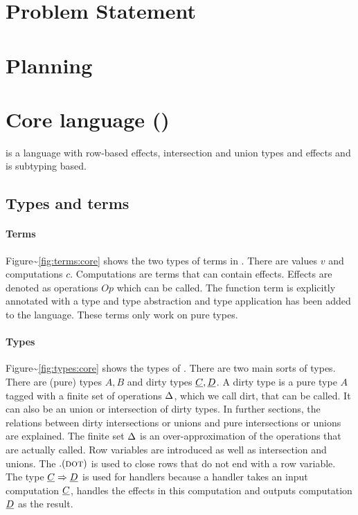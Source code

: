 \documentclass[sigplan,10pt]{acmart}\settopmatter{printfolios=true}
\begin{document}
\section{Problem Statement}\label{problem-statement}

\section{Planning}\label{planning}

\section{\texorpdfstring{Core language
(\core)}{Core language ()}}\label{core-language}

\core is a language with row-based effects, intersection and union types
and effects and is subtyping based.

\subsection{Types and terms}\label{types-and-terms-1}

\paragraph{Terms}

Figure\textasciitilde{}\ref{fig:terms:core} shows the two types of terms
in \core. There are values \(v\) and computations \(c\). Computations
are terms that can contain effects. Effects are denoted as operations
\(Op\) which can be called. The function term is explicitly annotated
with a type and type abstraction and type application has been added to
the language. These terms only work on pure types.

\paragraph{Types}

Figure\textasciitilde{}\ref{fig:types:core} shows the types of \core.
There are two main sorts of types. There are (pure) types \(A, B\) and
dirty types \(\underline{C}, \underline{D}\). A dirty type is a pure type \(A\) tagged with a
finite set of operations \(\Delta\), which we call dirt, that can be
called. It can also be an union or intersection of dirty types. In
further sections, the relations between dirty intersections or unions
and pure intersections or unions are explained. The finite set \(\Delta\)
is an over-approximation of the operations that are actually called. Row
variables are introduced as well as intersection and unions. The
\(. (\textsc{dot})\) is used to close rows that do not end with a row variable.
The type \(\underline{C} \Rightarrow \underline{D}\) is used for handlers because a handler takes an
input computation \(\underline{C}\), handles the effects in this computation and
outputs computation \(\underline{D}\) as the result.
\end{document}
